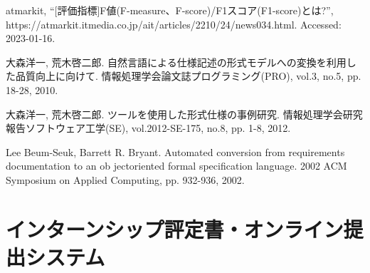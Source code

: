 \documentclass[uplatex, report, a4j, 10pt]{jsbook}
\begin{document}
\begin{thebibliography}{10}
    atmarkit, ``[評価指標]F値(F-measure、F-score)\slash F1スコア(F1-score)とは?'', https:\slash \slash atmarkit.itmedia.co.jp\slash ait\slash articles\slash 2210\slash 24\slash news034.html. Accessed: 2023-01-16.

    大森洋一, 荒木啓二郎. 
    自然言語による仕様記述の形式モデルへの変換を利用した品質向上に向けて. 
    情報処理学会論文誌プログラミング(PRO), 
    vol.3, no.5, pp. 18-28, 2010.

    大森洋一, 荒木啓二郎. 
    ツールを使用した形式仕様の事例研究. 
    情報処理学会研究報告ソフトウェア工学(SE), 
    vol.2012-SE-175, no.8, pp. 1-8, 2012.

    Lee Beum-Seuk, Barrett R. Bryant. 
    Automated conversion from requirements documentation to an ob jectoriented formal specification language. 
    2002 ACM Symposium on Applied Computing, pp. 932-936, 2002.

\end{thebibliography}

\appendix  %

\chapter{インターンシップ評定書・オンライン提出システム}\label{ET_Specifications}
\end{document}
